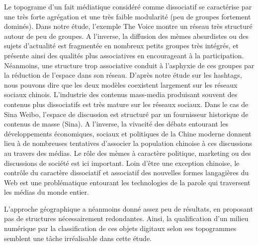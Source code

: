 Le topograme d’un fait médiatique considéré comme dissociatif se caractérise par une très forte agrégation et une très faible modularité (peu de groupes fortement dominés). Dans notre étude, l’exemple The Voice montre un réseau très structuré autour de peu de groupes. A l’inverse, la diffusion des mèmes absurdistes ou des sujets d’actualité est fragmentée en nombreux petits groupes très intégrés, et présente ainsi des qualités plus associatives en encourageant à la participation. Néanmoins, une structure trop associative conduit à l’asphyxie de ces groupes par la réduction de l’espace dans son réseau. D’après notre étude sur les hashtags, nous pouvons dire que les deux modèles coexistent largement sur les réseaux sociaux chinois. L’industrie des contenus mass-media produisant souvent des contenus plus dissociatifs est très mature sur les réseaux sociaux. Dans le cas de Sina Weibo, l’espace de discussion est structuré par un fournisseur historique de contenus de masse (Sina). A l’inverse, la vivacité des débats entourant les développements économiques, sociaux et politiques de la Chine moderne donnent lieu à de nombreuses tentatives d’associer la population chinoise à ces discussions au travers des médias. Le rôle des mèmes à caractère politique, marketing ou des discussions de société est ici important. Loin d’être une exception chinoise, le contrôle du caractère dissociatif et associatif des nouvelles formes langagières du Web est une problématique entourant les technologies de la parole qui traversent les médias du monde entier.

L{\textquoteright}approche géographique a néanmoins donné assez peu de résultats, en proposant pas de structures nécessairement redondantes. Ainsi, la qualification d{\textquoteright}un milieu numérique par la classification de ces objets digitaux selon ses topogrammes semblent une t\^ache irréalisable dans cette étude. 


\lipsum[4-10]